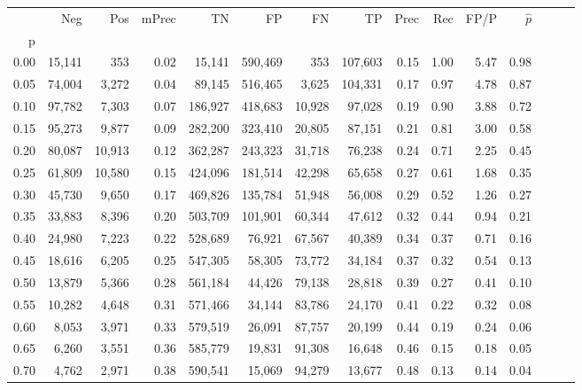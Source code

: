 \begin{tabular}{rrrrrrrrrrrrrrr}
\toprule
{} &     Neg &     Pos & mPrec &       TN &       FP &       FN &       TP &  Prec &   Rec &  FP/P & $\hat{p}$ \\
p    &         &         &       &          &          &          &          &       &       &       &           \\
\midrule
0.00 &  15,141 &     353 &  0.02 &   15,141 &  590,469 &      353 &  107,603 &  0.15 &  1.00 &  5.47 &      0.98 \\
0.05 &  74,004 &   3,272 &  0.04 &   89,145 &  516,465 &    3,625 &  104,331 &  0.17 &  0.97 &  4.78 &      0.87 \\
0.10 &  97,782 &   7,303 &  0.07 &  186,927 &  418,683 &   10,928 &   97,028 &  0.19 &  0.90 &  3.88 &      0.72 \\
0.15 &  95,273 &   9,877 &  0.09 &  282,200 &  323,410 &   20,805 &   87,151 &  0.21 &  0.81 &  3.00 &      0.58 \\
0.20 &  80,087 &  10,913 &  0.12 &  362,287 &  243,323 &   31,718 &   76,238 &  0.24 &  0.71 &  2.25 &      0.45 \\
0.25 &  61,809 &  10,580 &  0.15 &  424,096 &  181,514 &   42,298 &   65,658 &  0.27 &  0.61 &  1.68 &      0.35 \\
0.30 &  45,730 &   9,650 &  0.17 &  469,826 &  135,784 &   51,948 &   56,008 &  0.29 &  0.52 &  1.26 &      0.27 \\
0.35 &  33,883 &   8,396 &  0.20 &  503,709 &  101,901 &   60,344 &   47,612 &  0.32 &  0.44 &  0.94 &      0.21 \\
0.40 &  24,980 &   7,223 &  0.22 &  528,689 &   76,921 &   67,567 &   40,389 &  0.34 &  0.37 &  0.71 &      0.16 \\
0.45 &  18,616 &   6,205 &  0.25 &  547,305 &   58,305 &   73,772 &   34,184 &  0.37 &  0.32 &  0.54 &      0.13 \\
0.50 &  13,879 &   5,366 &  0.28 &  561,184 &   44,426 &   79,138 &   28,818 &  0.39 &  0.27 &  0.41 &      0.10 \\
0.55 &  10,282 &   4,648 &  0.31 &  571,466 &   34,144 &   83,786 &   24,170 &  0.41 &  0.22 &  0.32 &      0.08 \\
0.60 &   8,053 &   3,971 &  0.33 &  579,519 &   26,091 &   87,757 &   20,199 &  0.44 &  0.19 &  0.24 &      0.06 \\
0.65 &   6,260 &   3,551 &  0.36 &  585,779 &   19,831 &   91,308 &   16,648 &  0.46 &  0.15 &  0.18 &      0.05 \\
0.70 &   4,762 &   2,971 &  0.38 &  590,541 &   15,069 &   94,279 &   13,677 &  0.48 &  0.13 &  0.14 &      0.04 \\

\end{tabular}
